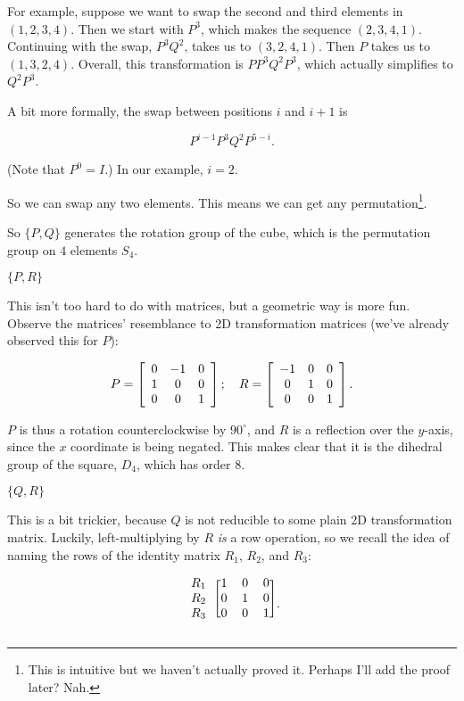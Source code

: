 \documentclass[../key.tex]{subfiles}
\begin{document}
For example, suppose we want to swap the second and third elements in $(1,2,3,4)$. Then we start with $P^3$, which makes the sequence $(2,3,4,1)$. Continuing with the swap, $P^3Q^2$, takes us to $(3,2,4,1)$. Then $P$ takes us to $(1,3,2,4)$. Overall, this transformation is $PP^3Q^2P^3$, which actually simplifies to $Q^2P^3$.

A bit more formally, the swap between positions $i$ and $i+1$ is

$$P^{i-1}P^3Q^2P^{5-i}.$$

(Note that $P^0=I$.) In our example, $i=2$.

So we can swap any two elements. This means we can get any permutation\footnote{This is intuitive but we haven't actually proved it. Perhaps I'll add the proof later? Nah.}.

So $\{P,Q\}$ generates the rotation group of the cube, which is the permutation group on $4$ elements $S_4$.

\begin{inner_problem}
\item $\{P,R\}$
\end{inner_problem}

This isn't too hard to do with matrices, but a geometric way is more fun. Observe the matrices' resemblance to 2D transformation matrices (we've already observed this for $P$):

$$P=\left[\begin{array}{ccc} 0 & -1 & 0 \\ 1 & 0 & 0 \\ 0 & 0 & 1 \end{array}\right];\quad R = \left[\begin{array}{ccc} -1 & 0 & 0 \\ 0 & 1 & 0 \\ 0 & 0 & 1 \end{array}\right].$$

$P$ is thus a rotation counterclockwise by $90^\circ$, and $R$ is a reflection over the $y$-axis, since the $x$ coordinate is being negated. This makes clear that it is the dihedral group of the square, $D_4$, which has order $8$.

\begin{inner_problem}
\item $\{Q,R\}$
\end{inner_problem}

This is a bit trickier, because $Q$ is not reducible to some plain 2D transformation matrix. Luckily, left-multiplying by $R$ \textit{is} a row operation, so we recall the idea of naming the rows of the identity matrix $R_1$, $R_2$, and $R_3$:

$$\begin{blockarray}{lccc}
\begin{block}{l[ccc]}
R_1 & 1 & 0 & 0 \\
R_2 & 0 & 1 & 0 \\
R_3 & 0 & 0 & 1 \\
\end{block}
\end{blockarray}.$$
\end{document}
